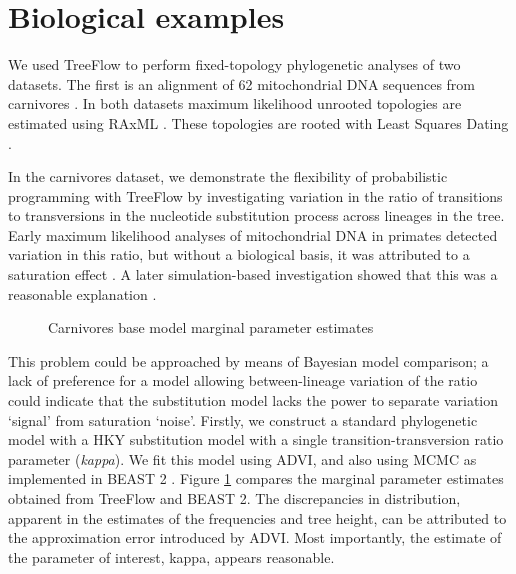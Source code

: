 \section{Biological examples}

We used TreeFlow to perform fixed-topology phylogenetic analyses of two datasets. The first is an alignment of 62 mitochondrial DNA sequences from carnivores \cite{suchard2009many}. In both datasets maximum likelihood unrooted topologies are estimated using RAxML \cite{stamatakis2014raxml}. These topologies are rooted with Least Squares Dating \cite{to2016lsd}.

In the carnivores dataset, we demonstrate the flexibility of probabilistic programming with TreeFlow by investigating variation in the ratio of transitions to transversions in the nucleotide substitution process across lineages in the tree. Early maximum likelihood analyses of mitochondrial DNA in primates detected variation in this ratio, but without a biological basis, it was attributed to a saturation effect \cite{yang1999estimation}. A later simulation-based investigation showed that this was a reasonable explanation \cite{duchene2015declining}.

\begin{figure}
    \centering
    \caption{Carnivores base model marginal parameter estimates}
    \label{fig:carnivoresmarginals}
\end{figure}

This problem could be approached by means of Bayesian model comparison; a lack of preference for a model allowing between-lineage variation of the ratio could indicate that the substitution model lacks the power to separate variation `signal' from saturation `noise'. Firstly, we construct a standard phylogenetic model with a HKY substitution model with a single transition-transversion ratio parameter (\textit{kappa}). We fit this model using ADVI, and also using MCMC as implemented in BEAST 2 \cite{bouckaert2019beast}. Figure \ref{fig:carnivoresmarginals} compares the marginal parameter estimates obtained from TreeFlow and BEAST 2. The discrepancies in distribution, apparent in the estimates of the frequencies and tree height, can be attributed to the approximation error introduced by ADVI. Most importantly, the estimate of the parameter of interest, kappa, appears reasonable.

